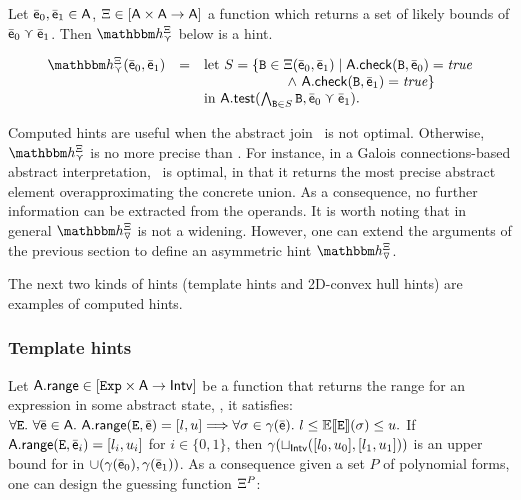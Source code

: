 \documentclass[sttt]{svjour}
\newcommand{\sopra}{}
\begin{document}
\begin{lemma}
Let $\bar{\mathsf{\mathsf{e}}}_0, \bar{\mathsf{\mathsf{e}}}_1 \in {\mathsf{A}}$,  $\Xi \in [\mathsf{A} \times \mathsf{A} \rightarrow{\mathsf{A}}]$
a function which returns a set of likely bounds of $\bar{\mathsf{\mathsf{e}}}_0 \curlyvee \bar{\mathsf{\mathsf{e}}}_1$. 
Then $\hint{\cjoin}^{\hintcomp}$ below is a hint.

\begin{small}
  \[
  \begin{array}{rcl}
    \hint{\cjoin}^{\hintcomp}(\ael{e}_0, \ael{e}_1) &=& \mathrm{let}\ S =
    \{ \code{B} \in \hintcomp(\ael{e}_0, \ael{e}_1) \mid
    \dom{A}.\checkif(\code{B}, \ael{e}_0) =\mathit{true} \\
    & & \qquad \qquad \qquad \wedge\  \dom{A}.\checkif(\code{B}, \ael{e}_1) = \mathit{true}   \} \\ 
    & & \mathrm{in}\ \dom{A}.\guard(\bigwedge_{\code{B} \in S} \code{B}, \ael{e}_0 \cjoin \ael{e}_1).
  \end{array}
  \]
\end{small}
\end{lemma}

Computed hints are useful when the abstract join \cjoin\ is not optimal.
Otherwise, $\hint{\cjoin}^{\hintcomp}$ is no more precise than \ajoin.
For instance, in a Galois connections-based abstract interpretation,
\ajoin\ is optimal, in that it returns the most precise
abstract element overapproximating the concrete union.
As a consequence, no further information can be extracted from the operands.
It is worth noting that in general
$\hint{\widening}^{\hintcomp}$ is not a widening.
However, one can extend the arguments of the previous section to define
an asymmetric hint $\hint{\widening}^{\hintcomp}$.

The next two kinds of hints (template hints and 2D-convex hull hints) are examples of computed hints.

\subsubsection{Template hints}
Let  ${\mathsf{A}}.\mathsf{\mathsf{range}} \in
[\mathtt{Exp} \times {\mathsf{A}} \rightarrow\mathsf{Intv}]$ be a  function that returns
the range  for an expression in some abstract state, \eg,
it satisfies:
  \(
  \forall \mathtt{E}.\ \forall \bar{\mathsf{\mathsf{e}}} \in {\mathsf{A}}.\
  {\mathsf{A}}.\mathsf{\mathsf{range}}(\mathtt{E}, \bar{\mathsf{\mathsf{e}}}) = [l, u] \Longrightarrow \forall \sigma \in
  \gamma(\bar{\mathsf{\mathsf{e}}}).\   l \leq \mathbb{E}\llbracket \mathtt{\mathtt{E}} \rrbracket(\sigma) \leq u.
  \)
If $\adom{A}.\arange(, \ael{e}_i) = [l_i, u_i]$ for $i \in \{
0, 1 \}$, then  $\gamma(\sqcup_{\mathsf{Intv}}([l_0, u_0],  [l_1, u_1]))$ is an upper
bound for \code{E} in $\cup(\gamma(\bar{\mathsf{\mathsf{e}}}_0),  \gamma(\bar{\mathsf{\mathsf{e}}}_1))$.
As a consequence given a set $P$ of polynomial forms, one can design
the guessing function $\Xi^{P}$:
\end{document}
